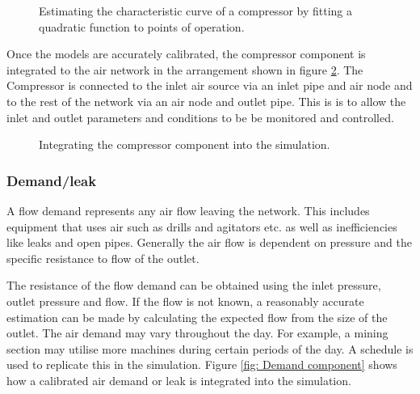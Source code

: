 		\begin{figure}[h]
			\centering
			\fbox{}
			\caption{Estimating the characteristic curve of a compressor by fitting a quadratic function to points of operation.}
			\label{fig: Compressor Curve}
		\end{figure}

		\par
		Once the models are accurately calibrated, the compressor component is integrated to the air network in the arrangement shown in figure \ref{fig: Compressor models}. The Compressor is connected to the inlet air source via an inlet pipe and air node and to the rest of the network via an air node and outlet pipe. This is is to allow the inlet and outlet parameters and conditions to be be monitored and controlled.
		\begin{figure}[h]
			\centering
			\caption{Integrating the compressor component into the simulation.}
			\label{fig: Compressor models}
		\end{figure}		

		\subsubsection{Demand/leak}
			A flow demand represents any air flow leaving the network. This includes equipment that uses air such as drills and agitators etc. as well as inefficiencies like leaks and open pipes. Generally the air flow is dependent on pressure and the specific resistance to flow of the outlet. 
			\par 
			The resistance of the flow demand can be obtained using the inlet pressure, outlet pressure and flow. If the flow is not known, a reasonably accurate estimation can be made by calculating the expected flow from the size of the outlet. The air demand may vary throughout the day. For example, a mining section may utilise more machines during certain periods of the day. A schedule is used to replicate this in the simulation. Figure \ref{fig: Demand component} shows how a calibrated air demand or leak is integrated into the simulation.
			
